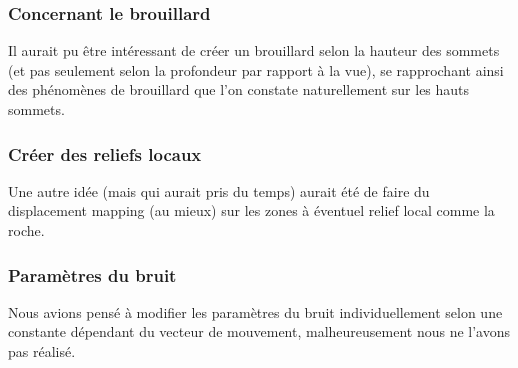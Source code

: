 \documentclass{article}
\begin{document}
\subsubsection{Concernant le brouillard}
Il aurait pu être intéressant de créer un brouillard selon la hauteur des sommets (et pas seulement selon la profondeur par rapport à la vue), se rapprochant ainsi des phénomènes de brouillard que l'on constate naturellement sur les hauts sommets.

\subsubsection{Créer des reliefs locaux}
Une autre idée (mais qui aurait pris du temps) aurait été de faire du displacement mapping (au mieux) sur les zones à éventuel relief local comme la roche.

\subsubsection{Paramètres du bruit}
Nous avions pensé à modifier les paramètres du bruit individuellement selon une constante dépendant du vecteur de mouvement, malheureusement nous ne l'avons pas réalisé.
\end{document}
